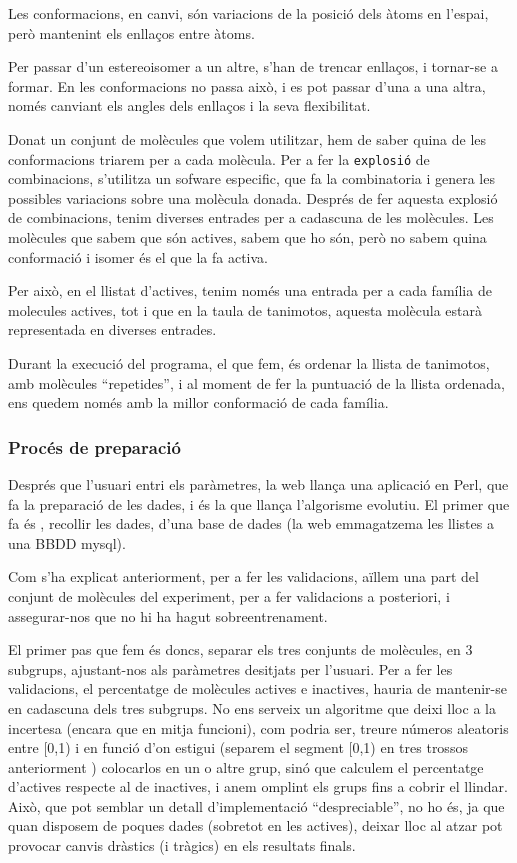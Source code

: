\documentclass[titlepage,a4paper,12pt]{book}
\begin{document}
Les conformacions, en canvi, són variacions de la posició dels àtoms en l'espai,
però mantenint els enllaços entre àtoms.

Per passar d'un estereoisomer a un altre, s'han de trencar enllaços, i tornar-se
a formar.  En les conformacions no passa això, i es pot passar d'una a una
altra, només canviant els angles dels enllaços i la seva flexibilitat. 

Donat un conjunt de molècules que volem utilitzar, hem de saber quina de les
conformacions triarem per a cada molècula.  Per a fer la \texttt{explosió} de
combinacions, s'utilitza un sofware especific, que fa la combinatoria i genera
les possibles variacions sobre una molècula donada. Després de fer aquesta
explosió de combinacions, tenim diverses entrades per a cadascuna de les
molècules.  Les molècules que sabem que són actives, sabem que ho són, però no
sabem quina conformació i isomer és el que la fa activa.

Per això, en el llistat d'actives, tenim només una entrada per a cada família de
molecules actives, tot i que en la taula de tanimotos, aquesta molècula estarà
representada en diverses entrades. 

Durant la execució del programa, el que fem, és ordenar la llista de tanimotos,
amb molècules ``repetides'', i al moment de fer la puntuació de la llista
ordenada, ens quedem només amb la millor conformació de cada família.

\subsubsection{Procés de preparació} %
\label{ssub:Proces de preparacio}

Després que l'usuari entri els paràmetres, la web llança una aplicació en Perl,
que fa la preparació de les dades, i és la que llança l'algorisme evolutiu.  El
primer que fa és , recollir les dades, d'una base de dades (la web emmagatzema
les llistes a una BBDD mysql).

Com s'ha explicat anteriorment, per a fer les validacions, aïllem una part del
conjunt de molècules del experiment, per a fer validacions a posteriori, i
assegurar-nos que no hi ha hagut sobreentrenament.

El primer pas que fem és doncs, separar els tres conjunts de molècules, en 3
subgrups, ajustant-nos als paràmetres desitjats per l'usuari.  Per a fer les
validacions, el percentatge de molècules actives e inactives, hauria de
mantenir-se en cadascuna dels tres subgrups. No ens serveix un algoritme que
deixi lloc a la incertesa (encara que en mitja funcioni), com podria ser, treure
números aleatoris entre [0,1) i en funció d'on estigui (separem el segment [0,1)
en tres trossos anteriorment ) colocarlos en un o altre grup, sinó que calculem
el percentatge d'actives respecte al de inactives, i anem omplint els grups fins
a cobrir el llindar.  Això, que pot semblar un detall d'implementació
``despreciable'', no ho és, ja que quan disposem de poques dades (sobretot en
les actives), deixar lloc al atzar pot provocar canvis dràstics (i tràgics) en
els resultats finals.
\end{document}
